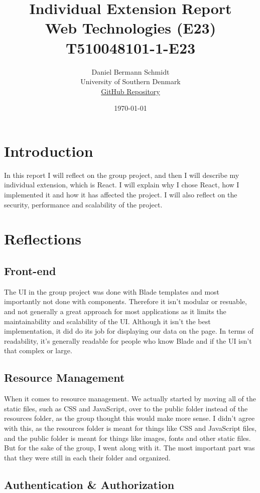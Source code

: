 \documentclass[letterpaper,twocolumn]{article}
\title{Individual Extension Report\\Web Technologies (E23)\\T510048101-1-E23}
\author{Daniel Bermann Schmidt\\University of Southern Denmark\\\href{https://github.com/Kururururururururu/MovielibLaravel/tree/Daniel_individuel_part}{GitHub Repository}}
\date{\today}
\begin{document}
\maketitle

\section{Introduction}
In this report I will reflect on the group project, and then I will describe my individual extension, which is React.
I will explain why I chose React, how I implemented it and how it has affected the project.
I will also reflect on the security, performance and scalability of the project.

\section{Reflections}
\subsection{Front-end}

The UI in the group project was done with Blade templates and most importantly not done with components.
Therefore it isn't modular or resuable, and not generally a great approach for most applications as it limits the maintainability and scalability of the UI.
Although it isn't the best implementation, it did do its job for displaying our data on the page.
In terms of readability, it's generally readable for people who know Blade and if the UI isn't that complex or large.

\subsection{Resource Management}
When it comes to resource management.
We actually started by moving all of the static files, such as CSS and JavaScript, over to the public folder instead of the resources folder, as the group thought this would make more sense.
I didn't agree with this, as the resources folder is meant for things like CSS and JavaScript files, and the public folder is meant for things like images, fonts and other static files.
But for the sake of the group, I went along with it. The most important part was that they were still in each their folder and organized.

\subsection{Authentication \& Authorization}
\end{document}

